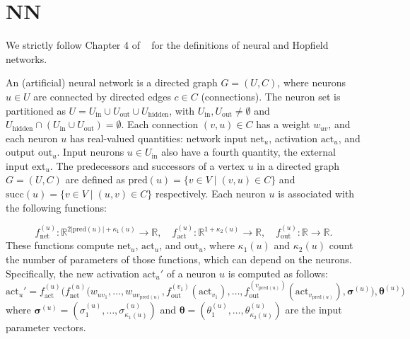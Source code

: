 \chapter{NN}

We strictly follow Chapter 4 of ~\cite{comp} for the definitions of neural and Hopfield networks.

\begin{definition}\label{NeuralNetwork}
An (artificial) neural network is a directed graph \( G = (U, C) \), where neurons \( u \in U \) 
are connected by directed edges \( c \in C \) (connections). 
The neuron set is partitioned as \( U = U_{\mathrm{in}} \cup U_{\mathrm{out}} \cup U_{\mathrm{hidden}} \), 
with \( U_{\mathrm{in}}, U_{\mathrm{out}} \neq \emptyset \) and \( U_{\mathrm{hidden}} \cap (U_{\mathrm{in}} 
\cup U_{\mathrm{out}}) = \emptyset \). Each connection \( (v, u) \in C \) has a weight \( w_{uv} \), and each neuron \( u \) 
has real-valued quantities: network input \( \mathrm{net}_u \), activation \( \mathrm{act}_u \), and output \( \mathrm{out}_u \).
Input neurons \( u \in U_{\mathrm{in}} \) also have a fourth quantity, the external input \( \mathrm{ext}_u \). 
The predecessors and successors of a vertex \( u \) in a directed graph \( G = (U, C) \) are defined as
$\mathrm{pred}(u) = \{ v \in V \mid (v, u) \in C \}$ and 
$\mathrm{succ}(u) = \{ v \in V \mid (u, v) \in C \}$ respectively. Each neuron \( u \) 
is associated with the following functions:  

$$f_{\mathrm{net}}^{(u)} : \mathbb{R}^{2|\mathrm{pred}(u)|+ \kappa_1 (u)} \to \mathbb{R}, \quad
 f_{\mathrm{act}}^{(u)} : \mathbb{R}^{1+\kappa_2 (u)} \to \mathbb{R}, \quad f_{\mathrm{out}}^{(u)} : \mathbb{R} \to \mathbb{R}. $$
 These functions compute \( \mathrm{net}_u \), \( \mathrm{act}_u \), and \( \mathrm{out}_u \), 
 where \( \kappa_1(u) \) and \( \kappa_2(u) \) count the number of parameters of those functions, 
 which can depend on the neurons. Specifically, the new activation $\mathrm{act}_u'$ of a neuron $u$ is computed as follows:
\begin{equation*}
\mathrm{act}_u'=  
f_{\mathrm{act}}^{(u)} \big(f_{\mathrm{net}}^{(u)} \big(
w_{uv_1}, \ldots, w_{uv_{\mathrm{pred}(u)}}, f_{\mathrm{out}}^{(v_1)}(\mathrm{act}_{v_1}),\ldots,
f_{\mathrm{out}}^{(v_{\mathrm{pred}(u)})}(\mathrm{act}_{v_{\mathrm{pred}(u)}}),
\boldsymbol{\sigma}^{(u)}\big), \boldsymbol{\theta}^{(u)}\big)
\end{equation*}
where $\boldsymbol{\sigma}^{(u)} = (\sigma_1^{(u)} , \ldots , 
\sigma_{\kappa_1(u)}^{(u)} )$ and $\boldsymbol{\theta} = (\theta_1^{(u)} , \ldots ,
 \theta_{\kappa_2(u)}^{(u)} )$ are the input parameter vectors.
\leanok
\end{definition}

